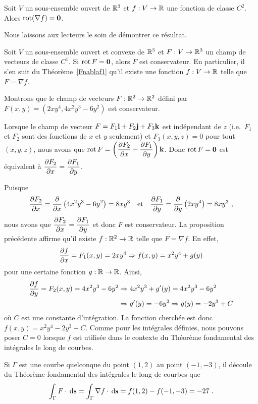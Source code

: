 {\begin{focus}{\prp}
Soit $V$ un sous-ensemble ouvert de $\RR^3$ et $f:V\to \RR$ une
fonction de classe $C^2$.  Alors
$\curl(\nabla f) = \VEC{0}$.
\end{focus}

Nous laissons aux lecteurs le soin de démontrer ce résultat.

\begin{focus}{\prp}
Soit $V$ un sous-ensemble ouvert et convexe de $\RR^3$ et
$F:V\to \RR^3$ un champ de vecteurs de classe $C^1$.  Si
$\curl F = \VEC{0}$, alors $F$ est conservateur.  En particulier, il
s'en suit du Théorème~\ref{Fnablaf1} qu'il existe une fonction
$f:V\to \RR$ telle que $F = \nabla f$.
\label{rotFzero}
\end{focus}

\begin{egg}
Montrons que le champ de vecteurs $F:\RR^2 \to \RR^2$ défini par
$F(x,y) = \left( 2 x y^4 , 4 x^2y^3 - 6 y^2\right)$ est conservateur.

Lorsque le champ de vecteur $F = F_1 \ii + F_2 \jj + F_3 \kk$ est
indépendant de $z$ (i.e.\ $F_1$ et $F_2$ sont des fonctions de $x$ et $y$
seulement) et $F_3(x,y,z) = 0$ pour tout $(x,y,z)$, nous avons que
$\displaystyle \curl F =
\left( \pdydx{F_2}{x} - \pdydx{F_1}{y}\right)\kk$.
Donc $\curl F = \VEC{0}$ est équivalent à
$\displaystyle \pdydx{F_2}{x} = \pdydx{F_1}{y}$.

Puisque
\[
\pdydx{F_2}{x} = \pdfdx{\left(4x^2 y^3 - 6 y^2\right)}{x} = 8x y^3
\quad \text{et} \quad
\pdydx{F_1}{y} = \pdfdx{\left(2 x y^4\right)}{y} = 8x y^3 \ ,
\]
nous avons que $\displaystyle \pdydx{F_2}{x} = \pdydx{F_1}{y}$ et donc
$F$ est conservateur.  La proposition précédente affirme qu'il existe
$f:\RR^2 \to \RR$ telle que $F = \nabla f$.  En effet,
\[
  \pdydx{f}{x} = F_1(x,y) = 2 x y^4 \Rightarrow f(x,y) = x^2 y^4 + g(y)
\]
pour une certaine fonction $g:\RR \to \RR$.  Ainsi,
\begin{align*}
\pdydx{f}{y} = F_2(x,y) = 4 x^2y^3 - 6 y^2 &\Rightarrow
4x^2y^3 + g'(y) = 4 x^2y^3 - 6 y^2 \\
& \Rightarrow  g'(y) = -6 y^2 \Rightarrow g(y) = -2 y^3 + C
\end{align*}
où $C$ est une constante d'intégration.  La fonction cherchée est donc
$f(x,y) = x^2 y^4 - 2 y^3 + C$.  Comme pour les intégrales
définies, nous pouvons poser $C=0$ lorsque $f$ est
utilisée dans le contexte du Théorème fondamental des intégrales le long
de courbes.

Si $\Gamma$ est une courbe quelconque du point $(1,2)$ au point
$(-1,-3)$, il découle du Théorème fondamental des intégrales le
long de courbes que
\[
  \int_{\Gamma} F \cdot \dx{\VEC{s}}
  = \int_{\Gamma} \nabla f \cdot \dx{\VEC{s}}
  = f(1,2)-f(-1,-3) =  -27 \ .
\]
\label{rotFzeroD2}
\end{egg}

}
